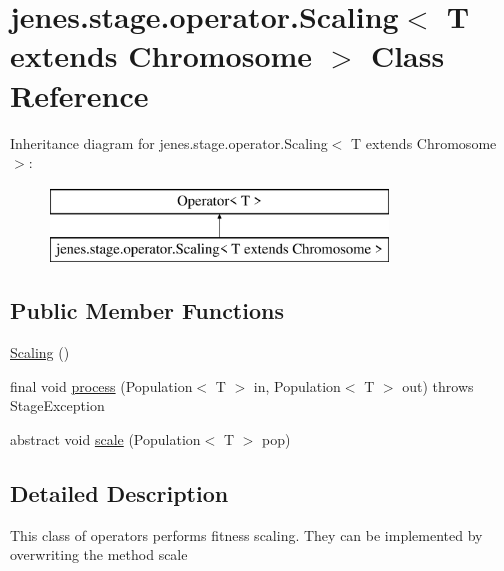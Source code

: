 \hypertarget{classjenes_1_1stage_1_1operator_1_1_scaling_3_01_t_01extends_01_chromosome_01_4}{\section{jenes.\-stage.\-operator.\-Scaling$<$ T extends Chromosome $>$ Class Reference}
\label{classjenes_1_1stage_1_1operator_1_1_scaling_3_01_t_01extends_01_chromosome_01_4}
}
Inheritance diagram for jenes.\-stage.\-operator.\-Scaling$<$ T extends Chromosome $>$\-:\begin{figure}[H]
\begin{center}
\leavevmode
\includegraphics[height=2.000000cm]{classjenes_1_1stage_1_1operator_1_1_scaling_3_01_t_01extends_01_chromosome_01_4}
\end{center}
\end{figure}
\subsection*{Public Member Functions}
\begin{DoxyCompactItemize}
\item 
\hyperlink{classjenes_1_1stage_1_1operator_1_1_scaling_3_01_t_01extends_01_chromosome_01_4_a04089dfb0f712c85ca27fdbab69a5b9e}{Scaling} ()
\item 
final void \hyperlink{classjenes_1_1stage_1_1operator_1_1_scaling_3_01_t_01extends_01_chromosome_01_4_a1577b3956323b5110e4c740ccaaa5905}{process} (Population$<$ T $>$ in, Population$<$ T $>$ out)  throws Stage\-Exception 
\item 
abstract void \hyperlink{classjenes_1_1stage_1_1operator_1_1_scaling_3_01_t_01extends_01_chromosome_01_4_ae72d4b2ab8bd3504471ce67788c841cd}{scale} (Population$<$ T $>$ pop)
\end{DoxyCompactItemize}


\subsection{Detailed Description}
This class of operators performs fitness scaling. They can be implemented by overwriting the method {\ttfamily scale}

